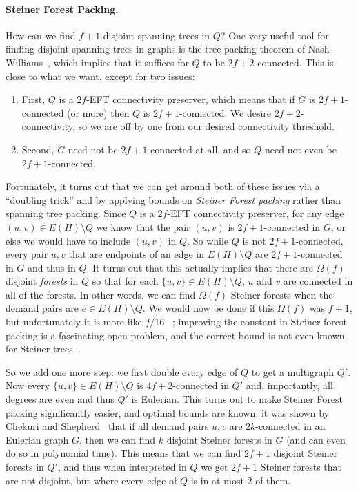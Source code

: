 \documentclass{article}
\theoremstyle{plain}
\theoremstyle{definition}
\begin{document}
\paragraph{Steiner Forest Packing.}  How can we find $f+1$ disjoint spanning trees in $Q$?
One very useful tool for finding disjoint spanning trees in graphs is the tree packing theorem of Nash-Williams~\cite{NashWilliams}, which implies that it suffices for $Q$ to be $2f+2$-connected.
This is close to what we want, except for two issues:
\begin{enumerate}
\item First, $Q$ is a $2f$-EFT connectivity preserver, which means that if $G$ is $2f+1$-connected (or more) then $Q$ is $2f+1$-connected.
We desire $2f+2$-connectivity, so we are off by one from our desired connectivity threshold.

\item Second, $G$ need not be $2f+1$-connected at all, and so $Q$ need not even be $2f+1$-connected.
\end{enumerate}
Fortunately, it turns out that we can get around both of these issues via a ``doubling trick'' and by applying bounds on \emph{Steiner Forest packing} rather than spanning tree packing.
Since $Q$ is a $2f$-EFT connectivity preserver, for any edge $(u, v) \in E(H) \setminus Q$ we know that the pair $(u, v)$ is $2f+1$-connected in $G$, or else we would have to include $(u, v)$ in $Q$.  So while $Q$ is not $2f+1$-connected, every pair $u,v$ that are endpoints of an edge in $E(H) \setminus Q$ are $2f+1$-connected in $G$ and thus in $Q$.  It turns out that this actually implies that there are $\Omega(f)$ disjoint \emph{forests} in $Q$ so that for each $\{u,v\} \in E(H) \setminus Q$, $u$ and $v$ are connected in all of the forests.  In other words, we can find $\Omega(f)$ Steiner forests when the demand pairs are $e \in E(H) \setminus Q$.  We would now be done if this $\Omega(f)$ was $f+1$, but unfortunately it is more like $f/16$ ~\cite{Lau05}; improving the constant in Steiner forest packing is a fascinating open problem, and the correct bound is not even known for Steiner trees~\cite{KRIESELLeven,DMP16}.

So we add one more step: we first double every edge of $Q$ to get a multigraph $Q'$.  Now every $\{u,v\} \in E(H) \setminus Q$ is $4f+2$-connected in $Q'$ and, importantly, all degrees are even and thus $Q'$ is Eulerian.  This turns out to make Steiner Forest packing significantly easier, and optimal bounds are known: it was shown by Chekuri and Shepherd~\cite{chekuri2009approximate} that if all demand pairs $u,v$ are $2k$-connected in an Eulerian graph $G$, then we can find $k$ disjoint Steiner forests in $G$ (and can even do so in polynomial time). This means that we can find $2f+1$ disjoint Steiner forests in $Q'$, and thus when interpreted in $Q$ we get $2f+1$ Steiner forests that are not disjoint, but where every edge of $Q$ is in at most $2$ of them. 
\end{document}
